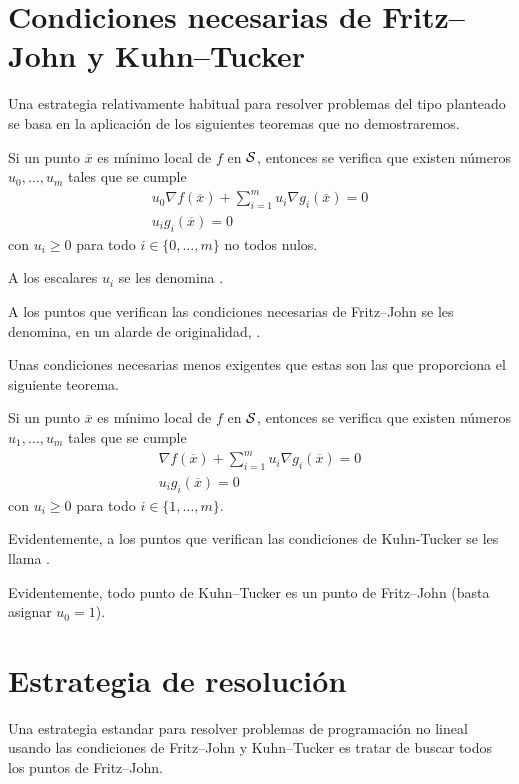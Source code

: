 \section{Condiciones necesarias de Fritz--John y Kuhn--Tucker}
Una estrategia relativamente habitual para resolver problemas del tipo planteado se basa en la aplicación de los siguientes teoremas que no demostraremos.
\begin{theo}
	Si un punto $\overline{x}$ es mínimo local de $f$ en $\mathcal{S}$, entonces se verifica que existen números $u_0,\dots,u_m$ tales que se cumple
	\begin{gather*}
		u_0\nabla f(\overline{x})+\sum_{i=1}^{m}u_i\nabla g_i(\overline{x})=0\\
		u_ig_i(\overline{x})=0
	\end{gather*}
	con $u_i\geq 0$ para todo $i\in\{0,\dots,m\}$ no todos nulos.
\end{theo}
\begin{defi}[Multiplicadores]
	A los escalares $u_i$ se les denomina .
\end{defi}
\begin{defi}
	A los puntos que verifican las condiciones necesarias de Fritz--John se les denomina, en un alarde de originalidad, .
\end{defi}
Unas condiciones necesarias menos exigentes que estas son las que proporciona el siguiente teorema.
\begin{theo}
	Si un punto $\overline{x}$ es mínimo local de $f$ en $\mathcal{S}$, entonces se verifica que existen números $u_1,\dots,u_m$ tales que se cumple
	\begin{gather*}
		\nabla f(\overline{x})+\sum_{i=1}^{m}u_i\nabla g_i(\overline{x})=0\\
		u_ig_i(\overline{x})=0
	\end{gather*}
	con $u_i\geq 0$ para todo $i\in\{1,\dots,m\}$.
\end{theo}
\begin{defi}
	Evidentemente, a los puntos que verifican las condiciones de Kuhn-Tucker se les llama .
\end{defi}
\begin{obs}[Relaciones]
	Evidentemente, todo punto de Kuhn--Tucker es un punto de Fritz--John (basta asignar $u_0=1$).
\end{obs}
\section{Estrategia de resolución}
Una estrategia estandar para resolver problemas de programación no lineal usando las condiciones de Fritz--John y Kuhn--Tucker es tratar de buscar todos los puntos de Fritz--John.

